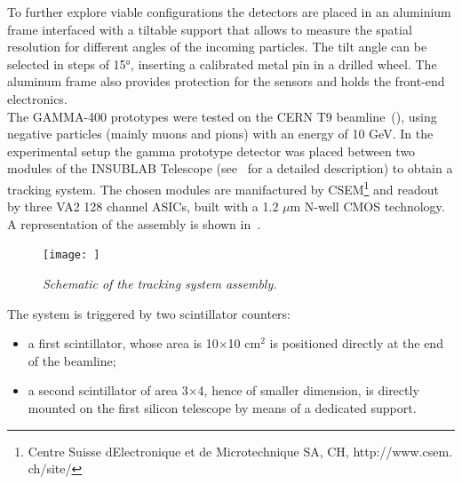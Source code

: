 \begin{table}[!htb]
\begin{center}
\caption{\small\it Features of the VA140 ASIC.}\label{tab:asic_basculo}
\end{center}
\end{table}

To further explore viable configurations the detectors are placed in an
aluminium frame interfaced with a tiltable support that allows to measure the
spatial resolution for different angles of the incoming particles. The tilt
angle can be selected in steps of 15$\si{\degree}$, inserting a calibrated metal
pin in a drilled wheel. The aluminum frame also provides protection for the
sensors and holds the front-end electronics.\\
The GAMMA-400 prototypes were tested on the CERN T9 beamline~(), using negative
particles (mainly muons and pions) with an energy of 10 GeV. In the experimental
setup the \gls{gamma} prototype detector was placed between two modules of the
INSUBLAB Telescope (see~ for a detailed description) to obtain a tracking system. The chosen modules are
manifactured by CSEM\footnote{Centre Suisse dElectronique et de Microtechnique
  SA, CH, http://www.csem. ch/site/} and readout by three VA2 128 channel ASICs,
built with a 1.2 $\mu$m N-well CMOS technology. A representation of
the assembly is shown in~.\\
\begin{figure}[!htb]
\centering
  \texttt{[image: ]}
\caption{\small \it Schematic of the tracking system assembly.}\label{fig:gamma400_final_assembly}
\end{figure}

The system is triggered by two scintillator counters: 
\begin{itemize}
\item a first scintillator, whose area is 10$\times$10 cm$^2$ is positioned
  directly at the end of the beamline;
\item a second scintillator of area 3$\times$4, hence of smaller dimension, is directly mounted on the first silicon telescope by means of a dedicated support.
\end{itemize}

